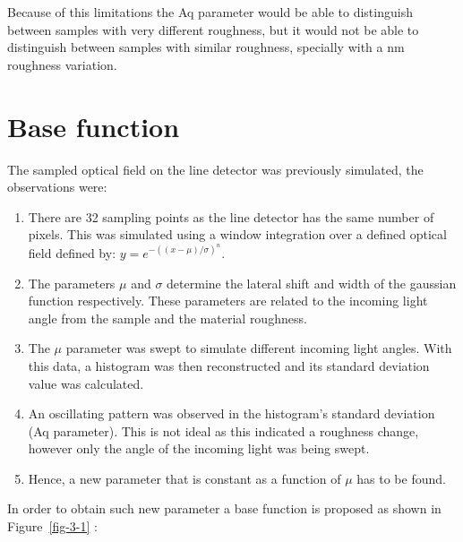 \documentclass[
  letterpaper,
  DIV=11,
  numbers=noendperiod,
  oneside]{scrreprt}
\begin{document}
Because of this limitations the Aq parameter would be able to
distinguish between samples with very different roughness, but it would
not be able to distinguish between samples with similar roughness,
specially with a nm roughness variation.

\newpage


\hypertarget{base-function}{%
\chapter{Base function}\label{base-function}}

The sampled optical field on the line detector was previously simulated,
the observations were:

\begin{enumerate}
\def\labelenumi{\arabic{enumi}.}
\item
  There are 32 sampling points as the line detector has the same number
  of pixels. This was simulated using a window integration over a
  defined optical field defined by: \(y = e^{-((x-\mu)/\sigma)^n}\).
\item
  The parameters \(\mu\) and \(\sigma\) determine the lateral shift and
  width of the gaussian function respectively. These parameters are
  related to the incoming light angle from the sample and the material
  roughness.
\item
  The \(\mu\) parameter was swept to simulate different incoming light
  angles. With this data, a histogram was then reconstructed and its
  standard deviation value was calculated.
\item
  An oscillating pattern was observed in the histogram's standard
  deviation (Aq parameter). This is not ideal as this indicated a
  roughness change, however only the angle of the incoming light was
  being swept.
\item
  Hence, a new parameter that is constant as a function of \(\mu\) has
  to be found.
\end{enumerate}

In order to obtain such new parameter a base function is proposed as
shown in Figure~\ref{fig-3-1} :
\end{document}
